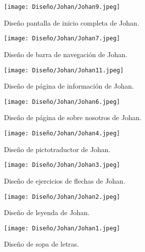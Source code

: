   \begin{figure}[ht!]
    \centering
    \texttt{[image: Diseño/Johan/Johan9.jpeg]}
    \caption{Diseño pantalla de inicio completa de Johan.}
    \label{Johan9}
  \end{figure}
  
  \begin{figure}[ht!]
    \centering
    \texttt{[image: Diseño/Johan/Johan7.jpeg]}
    \caption{Diseño de barra de navegación de Johan.}
    \label{Johan7}
  \end{figure}
  
  \begin{figure}[ht!]
    \centering
    \texttt{[image: Diseño/Johan/Johan11.jpeg]}
    \caption{Diseño de página de información de Johan.}
    \label{Johan11}
  \end{figure}
  
  \begin{figure}[ht!]
    \centering
    \texttt{[image: Diseño/Johan/Johan6.jpeg]}
    \caption{Diseño de página de sobre nosotros de Johan.}
    \label{Johan6}
  \end{figure}
  
  \begin{figure}[ht!]
    \centering
    \texttt{[image: Diseño/Johan/Johan4.jpeg]}
    \caption{Diseño de pictotraductor de Johan.}
    \label{Johan4}
  \end{figure}
  
  \begin{figure}[ht!]
    \centering
    \texttt{[image: Diseño/Johan/Johan3.jpeg]}
    \caption{Diseño de ejercicios de flechas de Johan.}
    \label{Johan3}
  \end{figure}
  
  \begin{figure}[ht!]
    \centering
  
  \texttt{[image: Diseño/Johan/Johan2.jpeg]}
    \caption{Diseño de leyenda de Johan.}
    \label{Johan2}
  \end{figure}
  
  \begin{figure}[ht!]
    \centering
  \texttt{[image: Diseño/Johan/Johan1.jpeg]}
    \caption{Diseño de sopa de letras.}
    
    \label{Johan1}
  \end{figure}
  
  